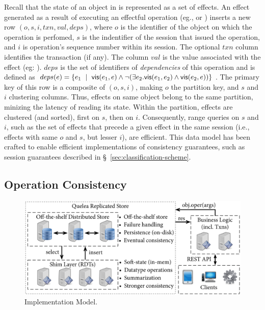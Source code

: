 Recall that the state of an object in \name is represented as a set of
effects. An effect generated as a result of executing an effectful
operation (eg., or ) inserts a new row
$(o,\allowbreak s,\allowbreak i, \allowbreak txn,\allowbreak val,
\allowbreak deps)$, where $o$ is the identifier of the object on which
the operation is perfomed, $s$ is the indentifier of the session that
issued the operation, and $i$ is operation's sequence number within
its session. The optional $txn$ column identifies the transaction (if
any). The column $val$ is the value associated with the effect (eg:
).  $deps$ is the set of identifiers of
\emph{dependencies} of this operation and is defined as $deps(e) =
\{e_1 ~\mid~ {\normalfont \textsf{vis}(e_1,e)} \wedge \neg(\exists e_2.{\normalfont \textsf{vis}(e_1,e_2)} \wedge
{\normalfont \textsf{vis}(e_2,e)})\}$. The primary key of this row is a composite of
$(o,s,i)$, making $o$ the partition key, and $s$ and $i$ clustering
columns. Thus, effects on same object belong to the same partition,
minizing the latency of reading its state. Within the partition,
effects are clustered (and sorted), first on $s$, then on $i$.
Consequently, range queries on $s$ and $i$, such as the set of effects
that precede a given effect in the same session (i.e., effects with
same $o$ and $s$, but lesser $i$), are efficient. This data model has
been crafted to enable efficient implementations of consistency
guarantees, such as session guarantees described in
\S~\ref{sec:classification-scheme}.

\subsection{Operation Consistency}

\begin{figure}
\begin{center}
\includegraphics[width=\columnwidth]{Figures/ImplModel}
\end{center}
\caption{Implementation Model.}
\label{fig:impl_mod}
\end{figure}

